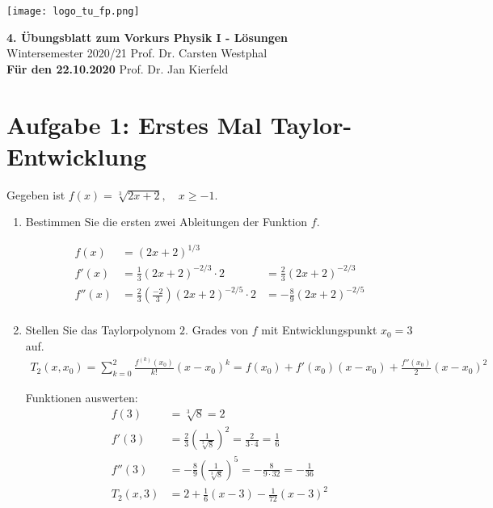 \documentclass[11pt,a4paper, parskip=half ]{report}
\newcommand{\GrosserAbstand}{\\[12pt]}
\begin{document}
\texttt{[image: logo\_tu\_fp.png]}
\begin{center}
\Large{\textbf{4. \"Ubungsblatt zum Vorkurs Physik I - Lösungen}}
\GrosserAbstand
\normalsize
Wintersemester 2020/21 \hfill Prof. Dr. Carsten Westphal\\
\textbf{Für den 22.10.2020} \hfill Prof. Dr. Jan Kierfeld \\
\end{center}

%
%
%
%


\section*{Aufgabe 1: Erstes Mal Taylor-Entwicklung}
  Gegeben ist $f(x) = \sqrt[3]{2x + 2}, \quad x \geq -1$.
  \begin{enumerate}
    \item Bestimmen Sie die ersten zwei Ableitungen der Funktion $f$.
    
    \vspace{20pt}
    \begin{align*}
    f(x) &= (2x + 2)^{1/3} \\ 
    f'(x) &= \frac{1}{3} (2x + 2)^{-2/3} \cdot 2 &= \frac{2}{3} (2x + 2)^{-2/3} \\ 
    f''(x) &= \frac{2}{3} \left(\frac{-2}{3}\right) (2x + 2)^{-2/5} \cdot 2 &= -\frac{8}{9} (2x + 2)^{-2/5} \\ 
    \end{align*}

    \item Stellen Sie das Taylorpolynom $2.$ Grades von $f$ mit Entwicklungspunkt $x_0 = 3$ auf.
    \vspace{20pt}
    \begin{align*}
      T_2(x, x_0) = \sum_{k = 0}^{2} \frac{f^{(k)} (x_0)}{k!} (x - x_0)^k = f(x_0) + f'(x_0)(x-x_0) + \frac{f''(x_0)}{2}(x - x_0)^2 
      \end{align*}

      Funktionen auswerten: 
      \begin{align*}
        f(3) &= \sqrt[3]{8} = 2 \\
        f'(3) &= \frac{2}{3} (\frac{1}{\sqrt[3]{8}})^2 = \frac{2}{3 \cdot 4} = \frac{1}{6} \\
        f''(3) &= -\frac{8}{9} (\frac{1}{\sqrt[3]{8}})^5 = -\frac{8}{9 \cdot 32} = - \frac{1}{36} \\
          T_2(x, 3) &= 2 + \frac{1}{6}(x-3) - \frac{1}{72}(x - 3)^2 \\
          \end{align*} 
  \end{enumerate}
\end{document}
